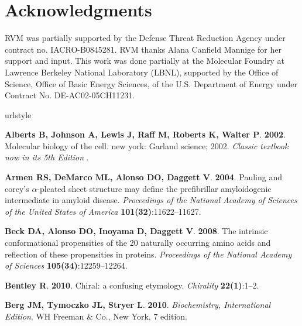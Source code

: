 \documentclass[fleqn,10pt,lineno]{wlpeerj} %
\newcommand{\n}[1]{{\color{blue}#1}}
\begin{document}
\section*{Acknowledgments}

RVM was \n{partially} supported by the Defense Threat Reduction Agency under contract no. IACRO-B0845281. RVM thanks Alana Canfield Mannige for her support and input. This work was done \n{partially} at the Molecular Foundry at Lawrence Berkeley National Laboratory (LBNL), supported by the Office of Science, Office of Basic Energy Sciences, of the U.S. Department of Energy under Contract No. DE-AC02-05CH11231.

%
\begin{thebibliography}{58}
\providecommand{\natexlab}[1]{#1}
\expandafter\ifx\csname urlstyle\endcsname\relax
  \providecommand{\doi}[1]{doi:\discretionary{}{}{}#1}\else
  \providecommand{\doi}{doi:\discretionary{}{}{}\begingroup
  \urlstyle{rm}\Url}\fi

\textbf{Alberts B, Johnson A, Lewis J, Raff M, Roberts K, Walter P}.
  \textbf{2002}.
\newblock Molecular biology of the cell. new york: Garland science; 2002.
\newblock \emph{Classic textbook now in its 5th Edition} .

\textbf{Armen RS, DeMarco ML, Alonso DO, Daggett V}. \textbf{2004}.
\newblock Pauling and corey's $\alpha$-pleated sheet structure may define the
  prefibrillar amyloidogenic intermediate in amyloid disease.
\newblock \emph{Proceedings of the National Academy of Sciences of the United
  States of America} \textbf{101(32)}:11622--11627.

\textbf{Beck DA, Alonso DO, Inoyama D, Daggett V}. \textbf{2008}.
\newblock The intrinsic conformational propensities of the 20 naturally
  occurring amino acids and reflection of these propensities in proteins.
\newblock \emph{Proceedings of the National Academy of Sciences}
  \textbf{105(34)}:12259--12264.

\textbf{Bentley R}. \textbf{2010}.
\newblock Chiral: a confusing etymology.
\newblock \emph{Chirality} \textbf{22(1)}:1--2.

\textbf{Berg JM, Tymoczko JL, Stryer L}. \textbf{2010}.
\newblock \emph{Biochemistry, International Edition}.
\newblock WH Freeman \& Co., New York, 7 edition.


\end{thebibliography}
\end{document}
